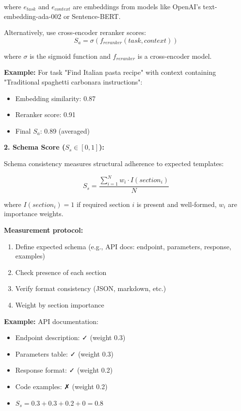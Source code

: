\documentclass[conference]{IEEEtran}
\begin{document}
where $e_{task}$ and $e_{context}$ are embeddings from models like OpenAI's text-embedding-ada-002 or Sentence-BERT.

Alternatively, use cross-encoder reranker scores:
\begin{equation}
S_a = \sigma(f_{reranker}(task, context))
\end{equation}

where $\sigma$ is the sigmoid function and $f_{reranker}$ is a cross-encoder model.

\textbf{Example:} For task "Find Italian pasta recipe" with context containing "Traditional spaghetti carbonara instructions":
\begin{itemize}
\item Embedding similarity: 0.87
\item Reranker score: 0.91
\item Final $S_a$: 0.89 (averaged)
\end{itemize}

\textbf{2. Schema Score ($S_s \in [0,1]$):}

Schema consistency measures structural adherence to expected templates:

\begin{equation}
S_s = \frac{\sum_{i=1}^{N} w_i \cdot I(section_i)}{N}
\end{equation}

where $I(section_i) = 1$ if required section $i$ is present and well-formed, $w_i$ are importance weights.

\textbf{Measurement protocol:}
\begin{enumerate}
\item Define expected schema (e.g., API docs: endpoint, parameters, response, examples)
\item Check presence of each section
\item Verify format consistency (JSON, markdown, etc.)
\item Weight by section importance
\end{enumerate}

\textbf{Example:} API documentation:
\begin{itemize}
\item Endpoint description: ✓ (weight 0.3)
\item Parameters table: ✓ (weight 0.3)
\item Response format: ✓ (weight 0.2)
\item Code examples: ✗ (weight 0.2)
\item $S_s = 0.3 + 0.3 + 0.2 + 0 = 0.8$
\end{itemize}
\end{document}
